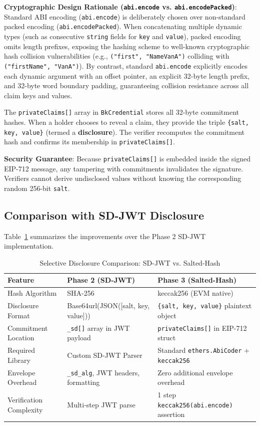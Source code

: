 \noindent\textbf{Cryptographic Design Rationale (\texttt{abi.encode} vs. \texttt{abi.encodePacked})}:\\
Standard ABI encoding (\texttt{abi.encode}) is deliberately chosen over non-standard packed encoding (\texttt{abi.encodePacked}). When concatenating multiple dynamic types (such as consecutive \texttt{string} fields for \texttt{key} and \texttt{value}), packed encoding omits length prefixes, exposing the hashing scheme to well-known cryptographic hash collision vulnerabilities (e.g., \texttt{("first", "NameVanA")} colliding with \texttt{("firstName", "VanA")}). By contrast, standard \texttt{abi.encode} explicitly encodes each dynamic argument with an offset pointer, an explicit 32-byte length prefix, and 32-byte word boundary padding, guaranteeing collision resistance across all claim keys and values.

The \texttt{privateClaims[]} array in \texttt{BkCredential} stores all 32-byte commitment hashes. When a holder chooses to reveal a claim, they provide the triple \texttt{\{salt, key, value\}} (termed a \textbf{disclosure}). The verifier recomputes the commitment hash and confirms its membership in \texttt{privateClaims[]}.

\textbf{Security Guarantee}: Because \texttt{privateClaims[]} is embedded inside the signed EIP-712 message, any tampering with commitments invalidates the signature. Verifiers cannot derive undisclosed values without knowing the corresponding random 256-bit \texttt{salt}.

\subsection{Comparison with SD-JWT Disclosure}

Table~\ref{tab:sd-comparison} summarizes the improvements over the Phase 2 SD-JWT implementation.

\begin{table}[H]
\centering
\renewcommand{\arraystretch}{1.3}
\begin{tabular}{|p{4.2cm}|p{5.2cm}|p{5.2cm}|}
\hline
\textbf{Feature} & \textbf{Phase 2 (SD-JWT)} & \textbf{Phase 3 (Salted-Hash)} \\
\hline
Hash Algorithm & SHA-256 & keccak256 (EVM native) \\
\hline
Disclosure Format & Base64url(JSON([salt, key, value])) & \texttt{\{salt, key, value\}} plaintext object \\
\hline
Commitment Location & \texttt{\_sd[]} array in JWT payload & \texttt{privateClaims[]} in EIP-712 struct \\
\hline
Required Library & Custom SD-JWT Parser & Standard \texttt{ethers.AbiCoder} + \texttt{keccak256} \\
\hline
Envelope Overhead & \texttt{\_sd\_alg}, JWT headers, formatting & Zero additional envelope overhead \\
\hline
Verification Complexity & Multi-step JWT parse & 1 step \texttt{keccak256(abi.encode)} assertion \\
\hline
\end{tabular}
\caption{Selective Disclosure Comparison: SD-JWT vs. Salted-Hash}
\label{tab:sd-comparison}
\end{table}


